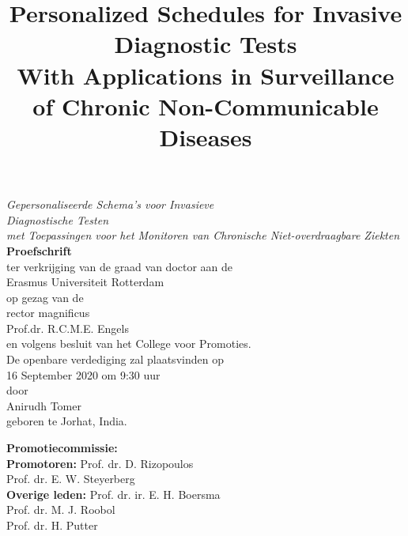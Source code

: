 \documentclass[12pt]{article}
\title{\textbf{\Large Personalized Schedules for Invasive\\Diagnostic Tests}\\\normalsize With Applications in Surveillance of Chronic Non-Communicable Diseases \vspace{-20mm}}
\date{}
\begin{document}
\maketitle
\begin{center}
\textit{\large Gepersonaliseerde Schema's voor Invasieve\\ Diagnostische Testen\\\normalsize met Toepassingen voor het Monitoren van Chronische Niet-overdraagbare Ziekten}\\
\vspace{10mm}
\textbf{\large{Proefschrift}}\\
\vspace{10mm}
ter verkrijging van de graad van doctor aan de\\
Erasmus Universiteit Rotterdam\\
op gezag van de\\
rector magnificus\\
\vspace{10mm}
Prof.dr. R.C.M.E. Engels\\
\vspace{10mm}
en volgens besluit van het College voor Promoties.\\
De openbare verdediging zal plaatsvinden op\\
16 September 2020 om 9:30 uur\\
\vspace{10mm}
door\\
\vspace{10mm}
Anirudh Tomer\\
geboren te Jorhat, India. 
\end{center}

\clearpage
\begin{flushleft}
\textbf{\large{Promotiecommissie:}}\\
\vspace{10mm}
\textbf{Promotoren:} \hspace{1.5mm} Prof. dr. D. Rizopoulos\\
\hspace{28mm} Prof. dr. E. W. Steyerberg\\
\vspace{10mm}
\textbf{Overige leden:} Prof. dr. ir. E. H. Boersma\\
\hspace{28mm} Prof. dr. M. J. Roobol\\
\hspace{28mm} Prof. dr. H. Putter\\
\end{flushleft}
\vspace*{\fill}
\end{document}
